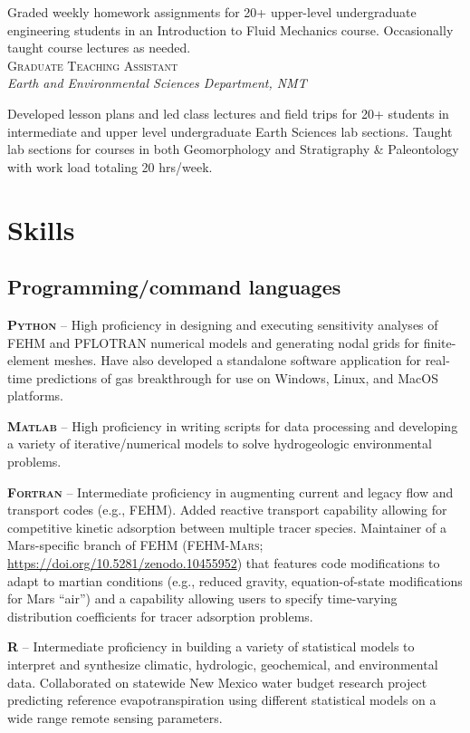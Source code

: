 \documentclass[11pt, letterpaper]{article}
\newcommand{\years}[1]{\marginnote{\scriptsize #1}}
\begin{document}
	Graded weekly homework assignments for 20+ upper-level undergraduate
	engineering students in an Introduction to Fluid Mechanics course.
	Occasionally taught course lectures as needed.\\

\years{2015 - 2016}\textsc{Graduate Teaching Assistant}\\
\textit{Earth and Environmental Sciences Department, NMT}

    Developed lesson plans and led class lectures and field trips for 20+
    students in intermediate and upper level undergraduate Earth Sciences lab
    sections. Taught lab sections for courses in both Geomorphology and Stratigraphy
    \& Paleontology with work load totaling 20 hrs/week.  

\section*{Skills}
\setlength{\parskip}{5pt}
\subsection*{Programming/command languages}
\noindent
\textbf{\textsc{Python}} -- High proficiency in designing and executing sensitivity
analyses of FEHM and PFLOTRAN numerical models and generating nodal grids for
finite-element meshes. Have also developed a standalone software application
for real-time predictions of gas breakthrough for use on Windows, Linux, and
MacOS platforms.

\textbf{\textsc{Matlab}} -- High proficiency in writing scripts for data processing and
developing a variety of iterative/numerical models to solve hydrogeologic
environmental problems.

\textbf{\textsc{Fortran}} -- Intermediate proficiency in augmenting current and legacy flow
and transport codes (e.g., \textsc{FEHM}). Added reactive transport capability
allowing for competitive kinetic adsorption between multiple tracer species.
Maintainer of a Mars-specific branch of \textsc{FEHM} (\textsc{FEHM-Mars};
\href{https://doi.org/10.5281/zenodo.10455952}{https://doi.org/10.5281/zenodo.10455952})
that features code modifications to adapt to martian conditions (e.g., reduced
gravity, equation-of-state modifications for Mars ``air'') and a capability
allowing users to specify time-varying distribution coefficients for tracer
adsorption problems.

\textbf{\textsc{R}} -- Intermediate proficiency in building a variety of statistical models
to interpret and synthesize climatic, hydrologic, geochemical, and
environmental data. Collaborated on statewide New Mexico water budget research
project predicting reference evapotranspiration using different statistical
models on a wide range remote sensing parameters.
\end{document}
